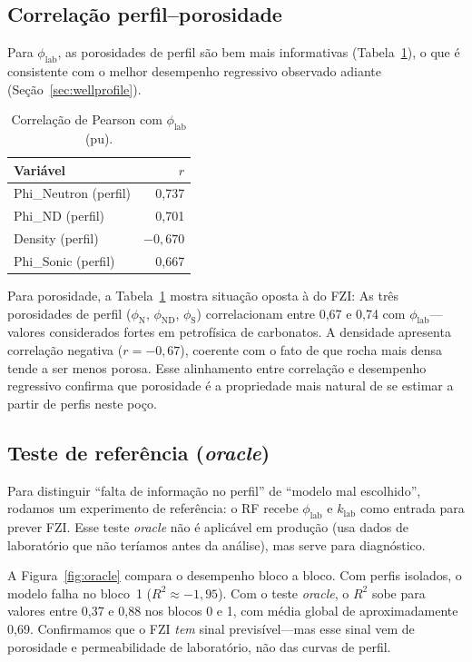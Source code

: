 \documentclass[11pt,a4paper]{article}
\newcommand{\philab}{\ensuremath{\phi_{\mathrm{lab}}}}
\newcommand{\klab}{\ensuremath{k_{\mathrm{lab}}}}
\newcommand{\phiND}{\ensuremath{\phi_{\mathrm{ND}}}}
\newcommand{\phiN}{\ensuremath{\phi_{\mathrm{N}}}}
\newcommand{\phiS}{\ensuremath{\phi_{\mathrm{S}}}}
\begin{document}
\subsection{Correlação perfil--porosidade}

Para \philab{}, as porosidades de perfil são bem mais
informativas (Tabela~\ref{tab:corr_phi}), o que é consistente com o
melhor desempenho regressivo observado adiante
(Seção~\ref{sec:wellprofile}).

\begin{table}[H]
  \centering
  \caption{Correlação de Pearson com \philab{} (pu).}
  \label{tab:corr_phi}
  \begin{tabular}{lr}
    \toprule
    Variável & $r$ \\
    \midrule
    Phi\_Neutron (perfil) & 0,737 \\
    Phi\_ND (perfil) & 0,701 \\
    Density (perfil) & $-0{,}670$ \\
    Phi\_Sonic (perfil) & 0,667 \\
    \bottomrule
  \end{tabular}
\end{table}

Para porosidade, a Tabela~\ref{tab:corr_phi} mostra situação oposta à do FZI:
As três porosidades de perfil (\phiN{}, \phiND{},
\phiS{}) correlacionam entre 0,67 e 0,74 com \philab{}---
valores considerados fortes em petrofísica de carbonatos.
A densidade apresenta correlação negativa ($r = -0{,}67$), coerente com
o fato de que rocha mais densa tende a ser menos porosa.
Esse alinhamento entre correlação e desempenho regressivo confirma que
porosidade é a propriedade mais natural de se estimar a partir de perfis
neste poço.

\subsection{Teste de referência (\emph{oracle})}

Para distinguir ``falta de informação no perfil'' de ``modelo mal
escolhido'', rodamos um experimento de referência: o RF recebe
\philab{} e \klab{} como entrada para prever FZI.
Esse teste \emph{oracle} não é aplicável em produção (usa
dados de laboratório que não teríamos antes da análise), mas serve
para diagnóstico.

A Figura~\ref{fig:oracle} compara o desempenho bloco a bloco.
Com perfis isolados, o modelo falha no bloco~1 ($R^2 \approx -1{,}95$).
Com o teste \emph{oracle}, o $R^2$ sobe para valores entre 0,37 e 0,88 nos
blocos 0 e 1, com média global de aproximadamente 0,69.
Confirmamos que o FZI \emph{tem} sinal previsível---mas esse sinal vem
de porosidade e permeabilidade de laboratório, não das curvas de perfil.
\end{document}

